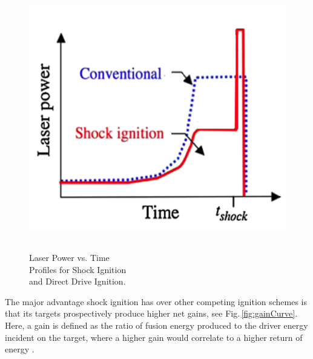 \begin{figure}	
	\centering
	\caption[Laser Power versus Time Profiles]{ \\ Laser Power vs. Time \\ Profiles for Shock Ignition \\ and Direct Drive Ignition. \\  }
	\includegraphics[scale=1]{graphics/laserProfile.png} 
	\label{fig:laserProfile}
\end{figure}

\pagebreak

The major advantage shock ignition has over other competing ignition schemes is that its targets prospectively produce higher net gains, see Fig.\,\ref{fig:gainCurve}.  Here, a gain is defined as the ratio of fusion energy produced to the driver energy incident on the target, where a higher gain would correlate to a higher return of energy \citep{mosesBook}.  

